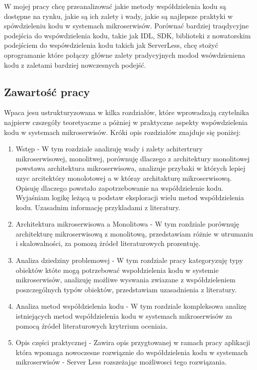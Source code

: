 \documentclass[runningheads,12pt]{llncs} \usepackage{graphicx} \usepackage{todonotes} \usepackage{fancyhdr} \usepackage{lipsum} \usepackage[T1]{fontenc} \usepackage[provide=*,english,polish]{babel}
\begin{document}
W mojej pracy chcę przeanalizować jakie metody współdzielenia kodu są dostępne na rynku, jakie są ich zalety i wady, jakie są najlepsze praktyki w spówdzieleniu kodu w systemach mikroserwisów. Porównać bardziej traqdycyjne podejścia do wspówdzielenia kodu, takie jak IDL, SDK, biblioteki z nowatorskim podejściem do wspówdzielenia kodu takich jak ServerLess, chcę stożyć oprogramanie które połączy główne zalety pradycyjnych modod wsówdzieniena kodu z zaletami bardziej nowczesnych podejść.

\newpage

\subsection{Zawartość pracy} Wpaca jesu ustrukturyzowana w kilka rozdziałów, które wprowadzają czytelnika najpierw czszegóły teoretyaczne a póżniej w praktyczne aspekty wspówdzielenia kodu w systemach mikroserwisów. Króki opis rozdziałów znajduje się poniżej: 
\begin{enumerate} 
    \item Wstęp - W tym rozdziale analizuję wady i zalety achitertrury mikroserwisowej, monolitwej, porównuję dlaczego z architektury monolitowej powstawa architektura mikroserwisowa, analizuje przybaki w których lepiej uzyc arcitektóry monolotowej a w któray architakturę mikroserwisową. Opisuję dlaczego powstało zapotrzebowanie na współdzielenie kodu. Wyjaśniam logikę leżącą u podstaw eksploracji wielu metod współdzielenia kodu. Uzasadnim informację przykladami z literatury. 
    \item Architektura mikroserwisowa a Monolitowa - W tym rozdziale porównuję architekturę mikroserwisową z monolitową, przedstawiam różnie w utrumaniu i skalowalności, za pomozą żródeł literaturowych prozentuję. 
    \item Analiza dziedziny problemowej - W tym rozdziale pracy kategoryzuję typy obiektów któte mogą potrzebować wspołdzielenia kodu w systemie mikroserwisów, analizuję możliwe wyswania zwiazane z współdzieleniem poszczególnych typów obiektów, przedstawiam uzasadnienia z literatury. 
    \item Analiza metod współdzielenia kodu - W tym rozdziale kompleksowa analizę istniejących metod współdzielenia kodu w systemach mikroserwisów za pomocą źródeł literaturowych krytrrium oceniaia. 
    \item Opis części praktycznej - Zawira opis przygtowanej w ramach pracy aplikacji która wpomaga nowoczesne rozwiąznie do współdzielenia kodu w systemach mikroserwisów - Server Less rozszeżając możliwosci tego rozwiązania. 
\end{enumerate}
\end{document}
